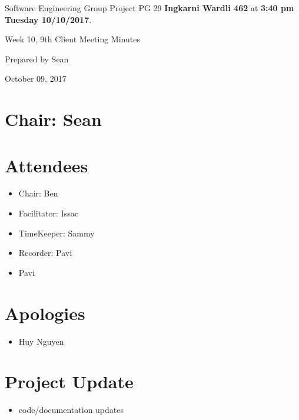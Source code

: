 \documentclass[11pt, a4paper]{article}
\begin{document}
\noindent Software Engineering Group Project PG 29 {\bf Ingkarni Wardli 462} at {\bf 3:40 pm Tuesday 10/10/2017}.
\vspace*{10pt}
\begin{center}
\huge Week 10, 9th Client Meeting Minutes
\end{center}
\vspace*{10pt}
\begin{center}
\huge Prepared by Sean
\end{center}
\begin{center}
\huge October 09, 2017
\end{center}
\section*{Chair: Sean}

\section{Attendees}
\begin{itemize}
\item Chair: Ben
\item Facilitator: Issac
\item TimeKeeper: Sammy
\item Recorder: Pavi
\item Pavi
\end{itemize}



\section{Apologies}
\begin{itemize}
\item Huy Nguyen
\end{itemize}


\section{Project Update}

\begin{itemize}
\item code/documentation updates
\end{itemize}
\end{document}
